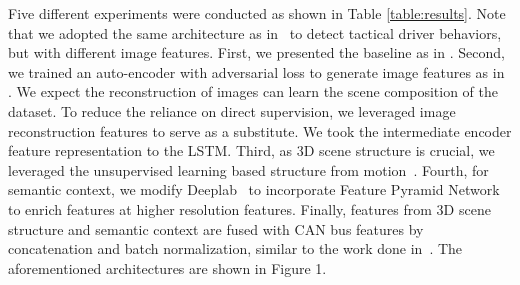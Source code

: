 \documentclass[10pt,twocolumn,letterpaper]{article}
\begin{document}
Five different experiments were conducted as shown in Table \ref{table:results}. Note that we adopted the same architecture as in~\cite{RamanishkaCVPR2018} to detect tactical driver behaviors, but with different image features. First, we presented the baseline as in \cite{RamanishkaCVPR2018}. Second, we trained an auto-encoder with adversarial loss to generate image features as in \cite{santana2016learning}. We expect the reconstruction of images can learn the scene composition of the dataset. To reduce the reliance on direct supervision, we leveraged image reconstruction features to serve as a substitute. We took the intermediate encoder feature representation to the LSTM. Third, as 3D scene structure is crucial, we leveraged the unsupervised learning based structure from motion~\cite{ZhouCVPR2017}. 
%
%
Fourth, for semantic context, we modify Deeplab~\cite{ChenPAMI2018} to incorporate Feature Pyramid Network~\cite{LinCVPR2017} to enrich features at higher resolution features. Finally, features from 3D scene structure and semantic context are fused with CAN bus features by concatenation and batch normalization, similar to the work done in~\cite{hazirbas2016fusenet}. The aforementioned architectures are shown in Figure 1.
\end{document}
